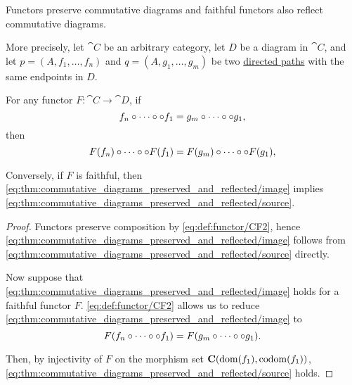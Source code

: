 \begin{proposition}\label{thm:commutative_diagrams_preserved_and_reflected}
  Functors preserve commutative diagrams and faithful functors also reflect commutative diagrams.

  More precisely, let \( \cat{C} \) be an arbitrary category, let \( D \) be a diagram in \( \cat{C} \), and let \( p = (A, f_1, \ldots, f_n) \) and \( q = (A, g_1, \ldots, g_m) \) be two \hyperref[def:quiver_path/directed]{directed paths} with the same endpoints in \( D \).

  For any functor \( F: \cat{C} \to \cat{D} \), if
  \begin{equation}\label{eq:thm:commutative_diagrams_preserved_and_reflected/source}
    f_n \bincirc \cdots \bincirc \bincirc f_1 = g_m \bincirc \cdots \bincirc \bincirc g_1,
  \end{equation}
  then
  \begin{equation}\label{eq:thm:commutative_diagrams_preserved_and_reflected/image}
    F(f_n) \bincirc \cdots \bincirc \bincirc F(f_1) = F(g_m) \bincirc \cdots \bincirc \bincirc F(g_1),
  \end{equation}

  Conversely, if \( F \) is faithful, then \eqref{eq:thm:commutative_diagrams_preserved_and_reflected/image} implies \eqref{eq:thm:commutative_diagrams_preserved_and_reflected/source}.
\end{proposition}
\begin{proof}
  Functors preserve composition by \ref{eq:def:functor/CF2}, hence \eqref{eq:thm:commutative_diagrams_preserved_and_reflected/image} follows from \eqref{eq:thm:commutative_diagrams_preserved_and_reflected/source} directly.

  Now suppose that \eqref{eq:thm:commutative_diagrams_preserved_and_reflected/image} holds for a faithful functor \( F \). \ref{eq:def:functor/CF2} allows us to reduce \eqref{eq:thm:commutative_diagrams_preserved_and_reflected/image} to
  \begin{equation*}
    F(f_n \bincirc \cdots \bincirc \bincirc f_1) = F(g_m \bincirc \cdots \bincirc \bincirc g_1).
  \end{equation*}

  Then, by injectivity of \( F \) on the morphism set \( \operatorname{\mathbf{C}}(\operatorname{dom}(f_1), \operatorname*{co\negthinspace\operatorname{dom}}(f_1)) \), \eqref{eq:thm:commutative_diagrams_preserved_and_reflected/source} holds.
\end{proof}

